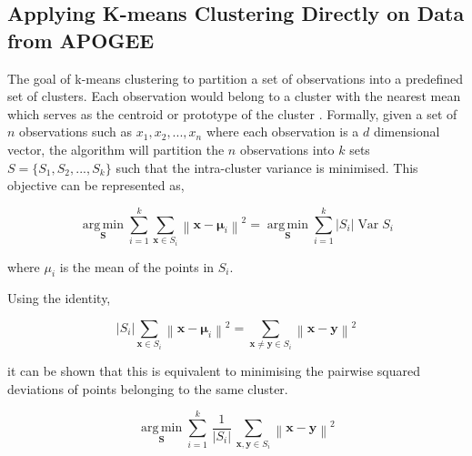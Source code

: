 \subsection{Applying K-means Clustering Directly on Data from APOGEE}
The goal of k-means clustering to partition a set of observations into a predefined set of clusters. Each observation would belong to a cluster with the nearest mean which serves as the centroid or prototype of the cluster \citep{macqueen1967some}. Formally, given a set of $n$ observations such as \(x_1,x_2,...,x_n\) where each observation is a $d$ dimensional vector, the algorithm will partition the $n$ observations into $k$ sets $S=\{S_1,S_2,...,S_k\}$ such that the intra-cluster variance is minimised. This objective can be represented as,

\begin{equation}
{\underset {\mathbf {S} }{\operatorname {arg\,min} }}\sum _{i=1}^{k}\sum _{\mathbf {x} \in S_{i}}\left\|\mathbf {x} -{\boldsymbol {\mu }}_{i}\right\|^{2}={\underset {\mathbf {S} }{\operatorname {arg\,min} }}\sum _{i=1}^{k}|S_{i}|\operatorname {Var} S_{i}
\end{equation}

where $\mu_i$ is the mean of the points in $S_i$. 

Using the identity,

\begin{equation}
    |S_{i}|\sum _{\mathbf {x} \in S_{i}}\left\|\mathbf {x} -{\boldsymbol {\mu }}_{i}\right\|^{2}=\sum _{\mathbf {x} \neq \mathbf {y} \in S_{i}}\left\|\mathbf {x} -\mathbf {y} \right\|^{2}
\end{equation}

it can be shown that this is equivalent to minimising the pairwise squared deviations of points belonging to the same cluster.

\begin{equation}
{\underset {\mathbf {S} }{\operatorname {arg\,min} }}\sum _{i=1}^{k}\,{\frac {1}{|S_{i}|}}\,\sum _{\mathbf {x} ,\mathbf {y} \in S_{i}}\left\|\mathbf {x} -\mathbf {y} \right\|^{2}
\end{equation}

